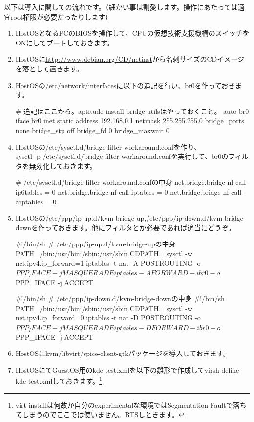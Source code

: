 \documentclass[mingoth,a4paper]{jsarticle}
\begin{document}
以下は導入に関しての流れです。（細かい事は割愛します。操作にあたっては適宜root権限が必要だったりします）
\begin{enumerate}
\item HostOSとなるPCのBIOSを操作して、CPUの仮想技術支援機構のスイッチをONにしてブートしておきます。
\item HostOSに\url{http://www.debian.org/CD/netinst}から名刺サイズのCDイメージを落として置きます。
\item HostOSの/etc/network/interfacesに以下の追記を行い、br0を作っておきます。
\begin{commandline}
# 追記はここから。aptitude install bridge-utilsはやっておくこと。
auto br0
iface br0 inet static
        address 192.168.0.1
        netmask 255.255.255.0
        bridge_ports none
        bridge_stp off
        bridge_fd 0
        bridge_maxwait 0
\end{commandline}
\item HostOSの/etc/sysctl.d/bridge-filter-workaround.confを作り、\\
sysctl -p /etc/sysctl.d/bridge-filter-workaround.confを実行して、br0のフィルタを無効化しておきます。
\begin{commandline}
# /etc/sysctl.d/bridge-filter-workaround.confの中身
net.bridge.bridge-nf-call-ip6tables = 0
net.bridge.bridge-nf-call-iptables = 0
net.bridge.bridge-nf-call-arptables = 0
\end{commandline}
\item HostOSの/etc/ppp/ip-up.d/kvm-bridge-up,/etc/ppp/ip-down.d/kvm-bridge-downを作っておきます。他にフィルタとか必要であれば適当にどうぞ。
\begin{commandline}
#!/bin/sh
# /etc/ppp/ip-up.d/kvm-bridge-upの中身
PATH=/bin:/usr/bin:/sbin:/usr/sbin
CDPATH=
sysctl -w net.ipv4.ip_forward=1
iptables -t nat -A POSTROUTING -o $PPP_IFACE -j MASQUERADE
iptables -A FORWARD -i br0 -o $PPP_IFACE -j ACCEPT
\end{commandline}
\begin{commandline}
#!/bin/sh
# /etc/ppp/ip-down.d/kvm-bridge-downの中身
#!/bin/sh
PATH=/bin:/usr/bin:/sbin:/usr/sbin
CDPATH=
sysctl -w net.ipv4.ip_forward=0
iptables -t nat -D POSTROUTING -o $PPP_IFACE -j MASQUERADE
iptables -D FORWARD -i br0 -o $PPP_IFACE -j ACCEPT
\end{commandline}
\item HostOSにkvm/libvirt/spice-client-gtkパッケージを導入しておきます。
\item HostOSにてGuestOS用のkde-test.xmlを以下の雛形で作成してvirsh define kde-test.xmlしておきます。\footnote{virt-installは何故か自分のexperimentalな環境ではSegmentation Faultで落ちてしまうのでここでは使いません。BTSしときます。}

\end{enumerate}
\end{document}
